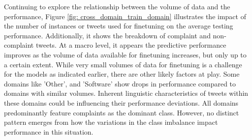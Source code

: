 Continuing to explore the relationship between the volume of data and the performance, Figure \ref{fig: cross_domain_train_domain} illustrates the impact of the number of instances or tweets used for finetuning on the average testing performance. Additionally, it shows the breakdown of complaint and non-complaint tweets. At a macro level, it appears the predictive performance improves as the volume of data available for finetuning increases, but only up to a certain extent. While very small volumes of data for finetuning is a challenge for the models as indicated earlier, there are other likely factors at play. Some domains like 'Other', and 'Software' show drops in performance compared to domains with similar volumes. Inherent linguistic characteristics of tweets within these domains could be influencing their performance deviations. All domains predominantly feature complaints as the dominant class. However, no distinct pattern emerges from how the variations in the class imbalance impact performance in this situation.